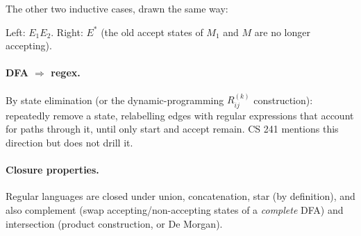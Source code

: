 The other two inductive cases, drawn the same way:
\begin{center}
\hspace{1cm}

\small Left: $E_1E_2$. Right: $E^*$ (the old accept states of $M_1$ and $M$ are no longer accepting).
\end{center}

\paragraph{DFA $\Rightarrow$ regex.} By state elimination (or the dynamic-programming
$R^{(k)}_{ij}$ construction): repeatedly remove a state, relabelling edges with regular
expressions that account for paths through it, until only start and accept remain. CS 241
mentions this direction but does not drill it.

\paragraph{Closure properties.} Regular languages are closed under union, concatenation,
star (by definition), and also complement (swap accepting/non-accepting states of a
\emph{complete} DFA) and intersection (product construction, or De Morgan).

